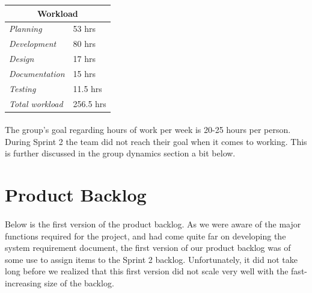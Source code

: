 \begin{minipage}{\linewidth}
\setlength{\tabcolsep}{25pt}
\centering
{}
\begin{tabular}{ |l|l| }
	\hline
	\multicolumn{2}{|c|}{\cellcolor{gray!25} Workload} \\
	\hline
	\it{Planning} & 53 hrs\\
	\it{Development} & 80 hrs \\
	\it{Design} & 17 hrs \\
	\it{Documentation} & 15 hrs \\
	\it{Testing} & 11.5 hrs \\
	\hline
	\it{Total workload} & 256.5 hrs \\
	\hline
\end{tabular}
\end{minipage}

\bigskip 

\paragraph{} The group’s goal regarding hours of work per week is 20-25 hours per person. During Sprint 2 the team did not reach their goal when it comes to working. This is further discussed in the group dynamics section a bit below. 

\section{Product Backlog}

\paragraph{} Below is the first version of the product backlog. As we were aware of the major functions required for the project, and had come quite far on developing the system requirement document, the first version of our product backlog was of some use to assign items to the Sprint 2 backlog. Unfortunately, it did not take long before we realized that this first version did not scale very well with the fast-increasing size of the backlog. 

